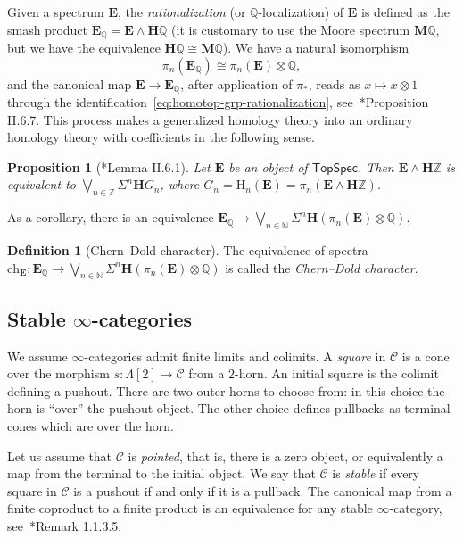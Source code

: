 \documentclass[a4paper,reqno]{amsart}
\theoremstyle{plain}
\newtheorem{proposition}[theorem]{Proposition}
\theoremstyle{definition}
\newtheorem{definition}[theorem]{Definition}
\theoremstyle{remark}
\numberwithin{equation}{section}
\newcommand{\rH}{\mathrm{H}}
\newcommand{\cC}{\mathcal{C}}
\newcommand{\dN}{\mathbb{N}}
\newcommand{\dQ}{\mathbb{Q}}
\newcommand{\dZ}{\mathbb{Z}}
\newcommand{\bE}{\mathbf{E}}
\newcommand{\bH}{\mathbf{H}}
\newcommand{\bM}{\mathbf{M}}
\newcommand{\TopSpec}{\mathsf{TopSpec}}
\newcommand{\ch}{\mathrm{ch}}
\begin{document}
Given a spectrum $\bE$, the \emph{rationalization} (or $\dQ$-localization) of $\bE$ is defined as the smash product $\bE_\dQ = \bE\wedge \bH\dQ$ (it is customary to use the Moore spectrum $\bM\dQ$, but we have the equivalence $\bH\dQ \cong \bM\dQ$).
We have a natural isomorphism
\begin{equation}\label{eq:homotop-grp-rationalization}
\pi_n(\bE_\dQ) \cong \pi_n(\bE) \otimes \dQ,
\end{equation}
and the canonical map $\bE \to \bE_\dQ$, after application of $\pi_*$, reads as $x\mapsto x\otimes 1$ through the identification~\eqref{eq:homotop-grp-rationalization}, see~\cite{adams:shgh}*{Proposition II.6.7}. This process makes a generalized homology theory into an ordinary homology theory with coefficients in the following sense.

\begin{proposition}[\cite{adams:shgh}*{Lemma II.6.1}]
Let $\bE$ be an object of $\TopSpec$. Then $\bE\wedge\bH \dZ$ is equivalent to $\bigvee_{n\in\dZ}\Sigma^n\bH G_n$, where $G_n = \rH_n(\bE) = \pi_n(\bE \wedge \bH\dZ)$.
\end{proposition}

As a corollary, there is an equivalence $\bE_\dQ \to \bigvee_{n\in\dN}\Sigma^n \bH(\pi_n(\bE)\otimes \dQ)$.

\begin{definition}[Chern--Dold character]\label{def:chdold}
The equivalence of spectra $\ch_\bE\colon \bE_\dQ \to \bigvee_{n\in\dN}\Sigma^n \bH(\pi_n(\bE)\otimes \dQ)$ is called the \emph{Chern--Dold character}.
\end{definition}

\subsection{Stable \texorpdfstring{$\infty$}{infinity}-categories}\label{subsec:spec} 

We assume $\infty$-categories admit finite limits and colimits. A \emph{square} in $\cC$ is a cone over the morphism $s\colon \Lambda[2]\to \cC$ from a $2$-horn. An initial square is the colimit defining a pushout. There are two outer horns to choose from: in this choice the horn is ``over'' the pushout object. The other choice defines pullbacks as terminal cones which are over the horn.

Let us assume that $\cC$ is \emph{pointed}, that is, there is a zero object, or equivalently a map from the terminal to the initial object.
We say that $\cC$ is \emph{stable} if every square in $\cC$ is a pushout if and only if it is a pullback.
The canonical map from a finite coproduct to a finite product is an equivalence for any stable $\infty$-category, see~\cite{lur:ha}*{Remark 1.1.3.5}.
\end{document}
